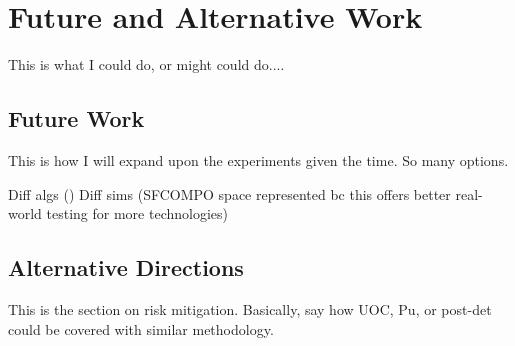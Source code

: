\chapter{Future and Alternative Work}
\label{ch:future}

This is what I could do, or might could do....

\section{Future Work}
\label{sec:expand}

This is how I will expand upon the experiments given the time.  So many
options.

Diff algs ()
Diff sims (SFCOMPO space represented bc this offers better real-world testing for more technologies)


\section{Alternative Directions}
\label{sec:riskmitig}

This is the section on risk mitigation. Basically, say how \gls{UOC}, Pu, or
post-det could be covered with similar methodology.
